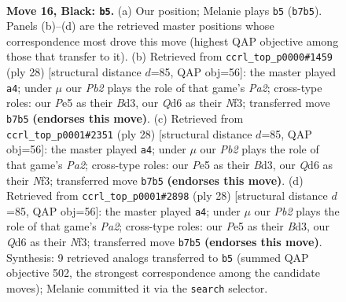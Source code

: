 \documentclass[11pt]{article}
\begin{document}
\clearpage

\begin{figure}[p]\centering
\begin{subfigure}{0.46\textwidth}\centering
\resizebox{\linewidth}{!}{%
\newchessgame
\chessboard[
  setfen={nrb2rk1/pp2npbp/3q4/2p1p2P/8/3PP3/PP3PBK/RNBQNR2 b - - 0 16},
  showmover=false,
  pgfstyle=straightmove, color=movearrow, markmove={b7-b5}
]}
\caption{}
\end{subfigure}\hfill
\begin{subfigure}{0.46\textwidth}\centering
\resizebox{\linewidth}{!}{%
\newchessgame
\chessboard[
  setfen={r1b1kb1r/3n1p1p/1q2pp2/8/1p1p4/3B1N2/PP2QPPP/R1B2RK1 w kq - 0 15},
  showmover=false,
  pgfstyle=straightmove, color=movearrow, markmove={a2-a4}
]}
\caption{}
\end{subfigure}
\\[4pt]
\begin{subfigure}{0.46\textwidth}\centering
\resizebox{\linewidth}{!}{%
\newchessgame
\chessboard[
  setfen={r1b1kb1r/3n1p1p/1q2pp2/8/1p1p4/3B1N2/PP2QPPP/R1B2RK1 w kq - 0 15},
  showmover=false,
  pgfstyle=straightmove, color=movearrow, markmove={a2-a4}
]}
\caption{}
\end{subfigure}\hfill
\begin{subfigure}{0.46\textwidth}\centering
\resizebox{\linewidth}{!}{%
\newchessgame
\chessboard[
  setfen={r1b1kb1r/3n1p1p/1q2pp2/8/1p1p4/3B1N2/PP2QPPP/R1B2RK1 w kq - 0 15},
  showmover=false,
  pgfstyle=straightmove, color=movearrow, markmove={a2-a4}
]}
\caption{}
\end{subfigure}
\caption{\textbf{Move 16, Black: \texttt{b5}.} (a) Our position; Melanie plays \texttt{b5} (\texttt{b7b5}). Panels (b)--(d) are the retrieved master positions whose correspondence most drove this move (highest QAP objective among those that transfer to it). (b) Retrieved from \texttt{ccrl\_top\_p0000\#1459} (ply 28) [structural distance $d$=85, QAP obj=56]: the master played \texttt{a4}; under $\mu$ our \emph{Pb2} plays the role of that game's \emph{Pa2}; cross-type roles: our \emph{P}e5 as their \emph{B}d3, our \emph{Q}d6 as their \emph{N}f3; transferred move \texttt{b7b5} \textbf{(endorses this move)}. (c) Retrieved from \texttt{ccrl\_top\_p0001\#2351} (ply 28) [structural distance $d$=85, QAP obj=56]: the master played \texttt{a4}; under $\mu$ our \emph{Pb2} plays the role of that game's \emph{Pa2}; cross-type roles: our \emph{P}e5 as their \emph{B}d3, our \emph{Q}d6 as their \emph{N}f3; transferred move \texttt{b7b5} \textbf{(endorses this move)}. (d) Retrieved from \texttt{ccrl\_top\_p0001\#2898} (ply 28) [structural distance $d$=85, QAP obj=56]: the master played \texttt{a4}; under $\mu$ our \emph{Pb2} plays the role of that game's \emph{Pa2}; cross-type roles: our \emph{P}e5 as their \emph{B}d3, our \emph{Q}d6 as their \emph{N}f3; transferred move \texttt{b7b5} \textbf{(endorses this move)}. Synthesis: 9 retrieved analogs transferred to \texttt{b5} (summed QAP objective 502, the strongest correspondence among the candidate moves); Melanie committed it via the \texttt{search} selector.}
\label{fig:thought-m31}
\end{figure}
\end{document}
